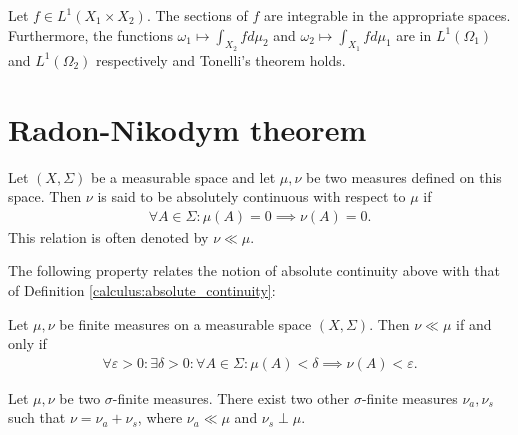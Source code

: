     \begin{result}[Fubini]
        Let $f\in L^1(X_1\times X_2)$. The sections of $f$ are integrable in the appropriate spaces. Furthermore, the functions $\omega_1\mapsto\int_{X_2}fd\mu_2$ and $\omega_2\mapsto\int_{X_1}fd\mu_1$ are in $L^1(\Omega_1)$ and $L^1(\Omega_2)$ respectively and Tonelli's theorem holds.
    \end{result}

\section{Radon-Nikodym theorem}\label{section:Radon-Nikodym}

    \begin{definition}\label{lebesgue:absolute_continuity}
        Let $(X,\Sigma)$ be a measurable space and let $\mu,\nu$ be two measures defined on this space. Then $\nu$ is said to be absolutely continuous with respect to $\mu$ if
        \begin{gather}
            \forall A\in\Sigma:\mu(A) = 0\implies\nu(A) = 0.
        \end{gather}
        This relation is often denoted by $\nu\ll\mu$.
    \end{definition}

    The following property relates the notion of absolute continuity above with that of Definition \ref{calculus:absolute_continuity}:
    \begin{property}
        Let $\mu,\nu$ be finite measures on a measurable space $(X,\Sigma)$. Then $\nu\ll\mu$ if and only if
        \begin{gather}
            \forall\varepsilon>0:\exists\delta>0:\forall A\in\Sigma:\mu(A)<\delta\implies\nu(A)<\varepsilon.
        \end{gather}
    \end{property}

    \begin{theorem}
        Let $\mu,\nu$ be two $\sigma$-finite measures. There exist two other $\sigma$-finite measures $\nu_a,\nu_s$ such that $\nu=\nu_a+\nu_s$, where $\nu_a\ll\mu$ and $\nu_s\perp\mu$.
    \end{theorem}

